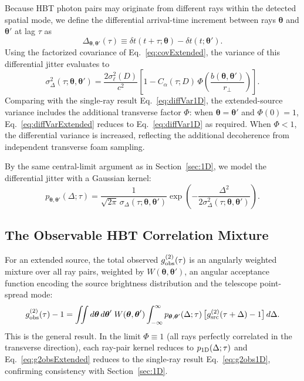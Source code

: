 \documentclass[aps,prd,onecolumn,amsmath,amssymb]{revtex4-2}
\begin{document}
Because HBT photon pairs may originate from different rays within the detected
spatial mode, we define the differential arrival-time increment between rays
$\boldsymbol{\theta}$ and $\boldsymbol{\theta}'$ at lag $\tau$ as
\begin{equation}
  \Delta_{\boldsymbol{\theta},\boldsymbol{\theta}'}(\tau)
  \equiv \delta t(t+\tau;\boldsymbol{\theta}) - \delta t(t;\boldsymbol{\theta}').
  \label{eq:diffJitterExtended}
\end{equation}
Using the factorized covariance of Eq.~\eqref{eq:covExtended}, the variance of
this differential jitter evaluates to
\begin{equation}
  \sigma_{\Delta}^2(\tau;\boldsymbol{\theta},\boldsymbol{\theta}')
  = \frac{2\sigma_\ell^2(D)}{c^2}
    \left[1 - C_\alpha(\tau;D)\,
          \Phi\!\left(\frac{b(\boldsymbol{\theta},\boldsymbol{\theta}')}{r_\perp}
               \right)\right].
  \label{eq:diffVarExtended}
\end{equation}
Comparing with the single-ray result Eq.~\eqref{eq:diffVar1D}, the
extended-source variance includes the additional transverse factor $\Phi$:
when $\boldsymbol{\theta} = \boldsymbol{\theta}'$ and $\Phi(0)=1$,
Eq.~\eqref{eq:diffVarExtended} reduces to Eq.~\eqref{eq:diffVar1D} as
required.
When $\Phi < 1$, the differential variance is increased, reflecting the
additional decoherence from independent transverse foam sampling.

By the same central-limit argument as in Section~\ref{sec:1D}, we model the
differential jitter with a Gaussian kernel:
\begin{equation}
  p_{\boldsymbol{\theta},\boldsymbol{\theta}'}(\Delta;\tau)
  = \frac{1}{\sqrt{2\pi}\,\sigma_{\Delta}(\tau;\boldsymbol{\theta},\boldsymbol{\theta}')}
    \exp\!\left(
      -\frac{\Delta^2}{2\sigma_{\Delta}^2(\tau;\boldsymbol{\theta},\boldsymbol{\theta}')}
    \right).
  \label{eq:kernelExtended}
\end{equation}

\subsection{The Observable HBT Correlation Mixture}

For an extended source, the total observed $g^{(2)}_{\rm obs}(\tau)$ is an
angularly weighted mixture over all ray pairs, weighted by
$W(\boldsymbol{\theta},\boldsymbol{\theta}')$, an angular acceptance function
encoding the source brightness distribution and the telescope point-spread mode:
\begin{equation}
  g^{(2)}_{\rm obs}(\tau) - 1
  = \iint d\boldsymbol{\theta}\,d\boldsymbol{\theta}'\;
    W(\boldsymbol{\theta},\boldsymbol{\theta}')
    \int_{-\infty}^{\infty}
      p_{\boldsymbol{\theta},\boldsymbol{\theta}'}(\Delta;\tau)\,
      \big[g^{(2)}_{\rm src}(\tau+\Delta) - 1\big]\,
    d\Delta.
  \label{eq:g2obsExtended}
\end{equation}
This is the general result.
In the limit $\Phi \equiv 1$ (all rays perfectly correlated in the transverse
direction), each ray-pair kernel reduces to $p_{\rm 1D}(\Delta;\tau)$ and
Eq.~\eqref{eq:g2obsExtended} reduces to the single-ray result
Eq.~\eqref{eq:g2obs1D}, confirming consistency with Section~\ref{sec:1D}.
\end{document}
